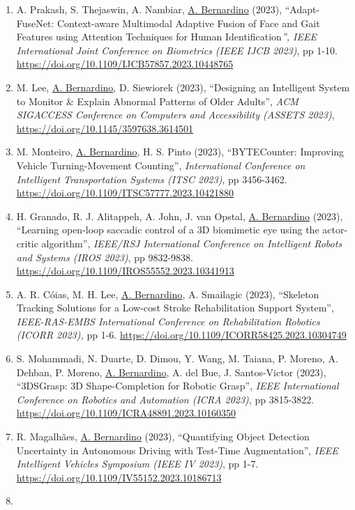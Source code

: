 \begin{enumerate}
{  2022.} \url{https://doi.org/10.1007/978-3-031-37317-6_2}
\item
  A. Prakash, S. Thejaswin, A. Nambiar, \ul{A. Bernardino} (2023),
  ``Adapt-FuseNet: Context-aware Multimodal Adaptive Fusion of Face and
  Gait Features using Attention Techniques for Human
  Identification\emph{'', IEEE International Joint Conference on
  Biometrics (IEEE IJCB 2023)}, pp 1-10.
  \url{https://doi.org/10.1109/IJCB57857.2023.10448765}
\item
  M. Lee, \ul{A. Bernardino}, D. Siewiorek (2023), ``Designing an
  Intelligent System to Monitor \& Explain Abnormal Patterns of Older
  Adults'', \emph{ACM SIGACCESS Conference on Computers and
  Accessibility (ASSETS 2023)},
  \url{https://doi.org/10.1145/3597638.3614501}
\item
  M. Monteiro, \ul{A. Bernardino}, H. S. Pinto (2023), ``BYTECounter:
  Improving Vehicle Turning-Movement Counting'', \emph{International
  Conference on Intelligent Transportation Systems (ITSC 2023)}, pp
  3456-3462. \url{https://doi.org/10.1109/ITSC57777.2023.10421880}
\item
  H. Granado, R. J. Alitappeh, A. John, J. van Opstal, \ul{A.
  Bernardino} (2023), ``Learning open-loop saccadic control of a 3D
  biomimetic eye using the actor-critic algorithm'', \emph{IEEE/RSJ
  International Conference on Intelligent Robots and Systems (IROS
  2023)}, pp 9832-9838.
  \url{https://doi.org/10.1109/IROS55552.2023.10341913}
\item
  A. R. Cóias, M. H. Lee, \ul{A. Bernardino}, A. Smailagic (2023),
  ``Skeleton Tracking Solutions for a Low-cost Stroke Rehabilitation
  Support System'', \emph{IEEE-RAS-EMBS International Conference on
  Rehabilitation Robotics (ICORR 2023),} pp 1-6.
  \url{https://doi.org/10.1109/ICORR58425.2023.10304749}
\item
  S. Mohammadi, N. Duarte, D. Dimou, Y. Wang, M. Taiana, P. Moreno, A.
  Dehban, P. Moreno, \ul{A. Bernardino}, A. del Bue, J. Santos-Victor
  (2023), ``3DSGrasp: 3D Shape-Completion for Robotic Grasp'',
  \emph{IEEE International Conference on Robotics and Automation (ICRA
  2023)}, pp 3815-3822.
  \url{https://doi.org/10.1109/ICRA48891.2023.10160350}
\item
  R. Magalhães, \ul{A. Bernardino} (2023), ``Quantifying Object
  Detection Uncertainty in Autonomous Driving with Test-Time
  Augmentation'', \emph{IEEE Intelligent Vehicles Symposium (IEEE IV
  2023)}, pp 1-7. \url{https://doi.org/10.1109/IV55152.2023.10186713}
\item

\end{enumerate}
